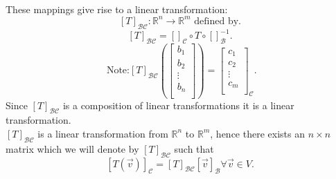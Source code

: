 \documentclass{report}
\begin{document}
\\



     \\
     \\
 These mappings give rise to a linear transformation:
 \[
   \left[ T \right] _{ \mathcal{B}  \mathcal{C} } : \mathbb{R} ^{n} \to \mathbb{R} ^{m} \text{ defined by}
 .\] 
 \[
   \left[ T \right] _{ \mathcal{B}  \mathcal{C} } = \left[  \right] _{ \mathcal{C}} {\circ}  T \circ \left[  \right] _{ \mathcal{B}} ^{-1} 
 .\] 
 \[
 \text{ Note:} \left[ T \right] _{ \mathcal{B}  \mathcal{C} } \left(  \begin{bmatrix}
 b_1\\
 b_2\\
 \vdots\\
 b_n\\
 \end{bmatrix}
   \right)     = \begin{bmatrix}
   c_1\\
   c_2\\
   \vdots \\
   c_m\\
   \end{bmatrix}  _{ \mathcal{C}}
 .\] 
Since $  \left[ T \right] _{ \mathcal{B} \mathcal{C}}$ is a composition of linear transformations it is a linear transformation.\\
    \thm{}
    {
      $ \left[ T \right] _{ \mathcal{B} \mathcal{C}}$ is a linear transformation from $ \mathbb{R} ^{n}$ to $ \mathbb{R} ^{m}$, hence there exists an $n \times n$  matrix which we will denote by $ \left[ T \right]_{ \mathcal{B} \mathcal{C}}$ such that 
      \[
        \left[ T \left( \vec{ v}  \right)  \right] _{ \mathcal{C}}= \left[ T \right] _{ \mathcal{B} \mathcal{C}} \left[ \vec{ v}  \right] _{ \mathcal{B}} \forall  \vec{ v} \in V
      .\] 
    }
\end{document}
